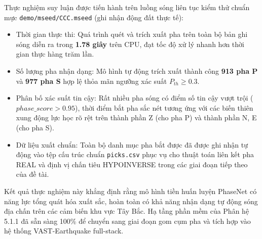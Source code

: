 \documentclass[preprint,1p]{elsarticle}
\begin{document}
Thực nghiệm suy luận được tiến hành trên luồng sóng liên tục kiểm thử chuẩn mực \texttt{demo/mseed/CCC.mseed} (ghi nhận động đất thực tế):
\begin{itemize}
    \item Thời gian thực thi: Quá trình quét và trích xuất pha trên toàn bộ bản ghi sóng diễn ra trong \textbf{1.78 giây} trên CPU, đạt tốc độ xử lý nhanh hơn thời gian thực hàng trăm lần.
    \item Số lượng pha nhận dạng: Mô hình tự động trích xuất thành công \textbf{913 pha P} và \textbf{977 pha S} hợp lệ thỏa mãn ngưỡng xác suất $P_{th} \ge 0.3$.
    \item Phân bố xác suất tin cậy: Rất nhiều pha sóng có điểm số tin cậy vượt trội ($phase\_score > 0.95$), thời điểm bắt pha sắc nét tương ứng với các biến thiên xung động lực học rõ rệt trên thành phần Z (cho pha P) và thành phần N, E (cho pha S).
    \item Dữ liệu xuất chuẩn: Toàn bộ danh mục pha bắt được đã được ghi nhận tự động vào tệp cấu trúc chuẩn \texttt{picks.csv} phục vụ cho thuật toán liên kết pha REAL và định vị chấn tiêu HYPOINVERSE trong các giai đoạn tiếp theo của đề tài.
\end{itemize}

Kết quả thực nghiệm này khẳng định rằng mô hình tiền huấn luyện PhaseNet có năng lực tổng quát hóa xuất sắc, hoàn toàn có khả năng nhận dạng tự động sóng địa chấn trên các cảm biến khu vực Tây Bắc. Hạ tầng phần mềm của Phân hệ 5.1.1 đã sẵn sàng 100\% để chuyển sang giai đoạn gom cụm pha và tích hợp vào hệ thống VAST-Earthquake full-stack.



\end{document}
